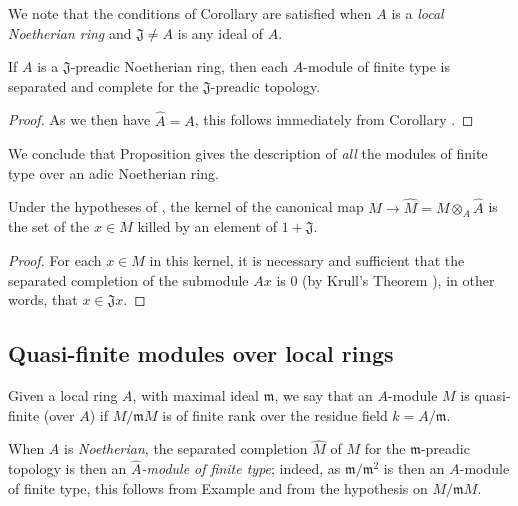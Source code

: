 We note that the conditions of Corollary  are satisfied
when $A$ is a \emph{local Noetherian ring} and $\mathfrak{J}\neq A$ is any ideal of $A$.

\begin{corollary}[7.3.6]
\label{0.7.3.6}
If $A$ is a $\mathfrak{J}$-preadic Noetherian ring, then each $A$-module of finite type
is separated and complete for the $\mathfrak{J}$-preadic topology.
\end{corollary}

\begin{proof}
As we then have $\widehat{A}=A$, this follows immediately from
Corollary .
\end{proof}

We conclude that Proposition  gives the description of
\emph{all} the modules of finite type over an adic Noetherian ring.

\begin{corollary}[7.3.7]
\label{0.7.3.7}
Under the hypotheses of , the kernel of the canonical map
$M\to\widehat{M}=M\otimes_A\widehat{A}$ is the set of the $x\in M$ killed by an element of
$1+\mathfrak{J}$.
\end{corollary}

\begin{proof}
For each $x\in M$ in this kernel, it is necessary and sufficient that the separated
completion of the submodule $Ax$ is $0$
(by Krull's Theorem ), in other words, that
$x\in\mathfrak{J}x$.
\end{proof}

\subsection{Quasi-finite modules over local rings}
\label{subsection:0.7.4}

\begin{definition}[7.4.1]
\label{0.7.4.1}
Given a local ring $A$, with maximal ideal $\mathfrak{m}$, we say that an $A$-module $M$
is quasi-finite (over $A$) if $M/\mathfrak{m}M$ is of finite rank over the residue field
$k=A/\mathfrak{m}$.
\end{definition}

When $A$ is \emph{Noetherian}, the separated completion $\widehat{M}$ of $M$ for the
$\mathfrak{m}$-preadic topology is then an \emph{$\widehat{A}$-module of finite type};
indeed, as $\mathfrak{m}/\mathfrak{m}^2$ is then an $A$-module of finite type, this follows
from Example  and from the hypothesis on $M/\mathfrak{m}M$.

